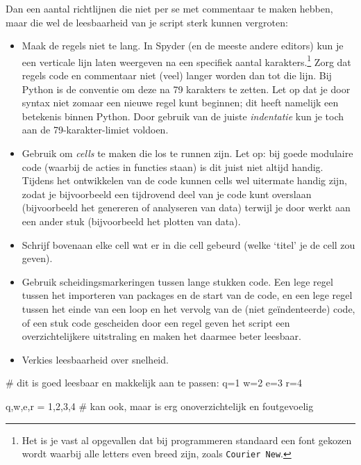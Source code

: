 \documentclass[a4paper,11pt, fleqn]{article}
\begin{document}
Dan een aantal richtlijnen die niet per se met commentaar te maken hebben, maar die wel de leesbaarheid van je script sterk kunnen vergroten:
\begin{itemize}
\item Maak de regels niet te lang. In Spyder (en de meeste andere editors) kun je een verticale lijn laten weergeven na een specifiek aantal karakters.\footnote{Het is je vast al opgevallen dat bij programmeren standaard een font gekozen wordt waarbij alle letters even breed zijn, zoals \texttt{Courier New}.} Zorg dat regels code en commentaar niet (veel) langer worden dan tot die lijn. Bij Python is de conventie om deze na 79 karakters te zetten. Let op dat je door syntax niet zomaar een nieuwe regel kunt beginnen; dit heeft namelijk een betekenis binnen Python. Door gebruik van de juiste \textit{indentatie} kun je toch aan de 79-karakter-limiet voldoen.
\item Gebruik \pythoninline{#\%\%} om \textit{cells} te maken die los te runnen zijn. Let op: bij goede modulaire code (waarbij de acties in functies staan) is dit juist niet altijd handig. Tijdens het ontwikkelen van de code kunnen cells wel uitermate handig zijn, zodat je bijvoorbeeld een tijdrovend deel van je code kunt overslaan (bijvoorbeeld het genereren of analyseren van data) terwijl je door werkt aan een ander stuk (bijvoorbeeld het plotten van data).
\item Schrijf bovenaan elke cell wat er in die cell gebeurd (welke `titel' je de cell zou geven).
\item Gebruik scheidingsmarkeringen tussen lange stukken code. Een lege regel tussen het importeren van packages en de start van de code, en een lege regel tussen het einde van een loop en het vervolg van de (niet ge\"indenteerde) code, of een stuk code gescheiden door een regel \pythoninline{#---------} geven het script een overzichtelijkere uitstraling en maken het daarmee beter leesbaar.
\item Verkies leesbaarheid over snelheid.
\end{itemize}
\begin{python}
# dit is goed leesbaar en makkelijk aan te passen:
q=1
w=2
e=3
r=4

q,w,e,r = 1,2,3,4 # kan ook, maar is erg onoverzichtelijk en foutgevoelig
\end{python}
\end{document}
